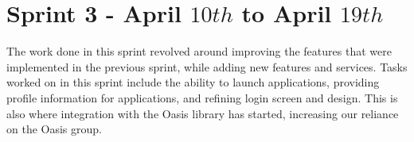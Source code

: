 \section{Sprint 3 - April $10th$ to April $19th$}
The work done in this sprint revolved around improving the features that were implemented in the previous sprint, while adding new features and services. 
Tasks worked on in this sprint include the ability to launch applications, providing profile information for applications, and refining login screen and design. 
This is also where integration with the Oasis library has started, increasing our reliance on the Oasis group. 